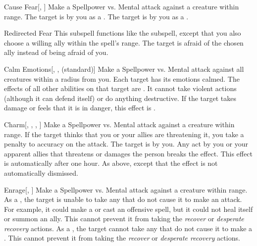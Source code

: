 \begin{ability}[\nth{1}]{Cause Fear}[, ]
Make a Spellpower vs. Mental attack against a creature within \rngmed range.
\hit The target is \frightened by you as a .
\crit The target is \panicked by you as a .
\end{ability}
\vspace{0.25em}


\begin{ability}[\nth{2}]{Redirected Fear}
This subspell functions like the  subspell, except that you also choose a willing ally within the spell's range.
The target is afraid of the chosen ally instead of being afraid of you.
\end{ability}
\vspace{0.25em}


\begin{ability}[\nth{3}]{Calm Emotions}[, ,  (standard)]
Make a Spellpower vs. Mental attack against all creatures within a \areamed radius from you.
\hit Each target has its emotions calmed.
The effects of all other  abilities on that target are .
It cannot take violent actions (although it can defend itself) or do anything destructive.
If the target takes damage or feels that it is in danger, this effect is .
\end{ability}
\vspace{0.25em}


\begin{ability}[\nth{3}]{Charm}[, , , ]
Make a Spellpower vs. Mental attack against a creature within \rngmed range.
If the target thinks that you or your allies are threatening it, you take a  penalty to accuracy on the attack.
\hit The target is \charmed by you.
Any act by you or your apparent allies that threatens or damages the  person breaks the effect.
This effect is automatically  after one hour.
\crit As above, except that the effect is not automatically dismissed.
\end{ability}
\vspace{0.25em}


\begin{ability}[\nth{4}]{Enrage}[, ]
Make a Spellpower vs. Mental attack against a creature within \rngmed range.
\hit As a , the target is unable to take any  that do not cause it to make an attack.
For example, it could make a  or cast an offensive spell, but it could not heal itself or summon an ally.
This cannot prevent it from taking the \textit{recover} or \textit{desperate recovery} actions.
\crit As a , the target cannot take any  that do not cause it to make a .
This cannot prevent it from taking the \textit{recover} or \textit{desperate recovery} actions.
\end{ability}
\vspace{0.25em}


